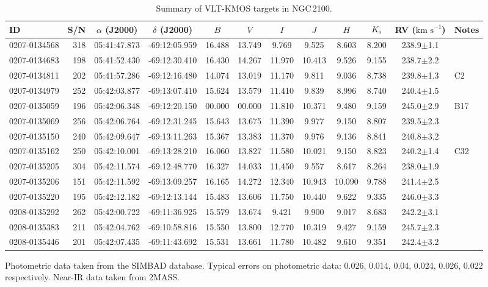 \documentclass[useAMS,usenatbib]{mn2e}
\def\kms{$\mbox{km s}^{-1}$}
\begin{document}
\begin{table}
\caption{
        Summary of VLT-KMOS targets in NGC\,2100.\label{tb:obs-params}
        }
\scriptsize
\begin{center}
\begin{tabular}{lrcccccccccl}
 \hline
 \hline
ID & S/N & $\alpha$ (J2000) & $\delta$ (J2000) & $B$ & $V$ & $I$ & $J$ & $H$ & $K_{\rm s}$ & RV (\kms) & Notes \\
 \hline
0207-0134568 & 318 & 05:41:47.873 & -69:12:05.959 & 16.488 & 13.749 &  9.769 &  9.525 &  8.603 & 8.200 & 238.9$\pm$1.1\\
0207-0134683 & 198 & 05:41:52.430 & -69:12:30.410 & 16.430 & 14.267 & 11.970 & 10.413 &  9.526 & 9.155 & 238.7$\pm$2.2\\
0207-0134811 & 202 & 05:41:57.286 & -69:12:16.480 & 14.074 & 13.019 & 11.170 &  9.811 &  9.036 & 8.738 & 239.8$\pm$1.3 & C2\\
0207-0134979 & 252 & 05:42:03.877 & -69:13:07.410 & 15.624 & 13.579 & 11.410 &  9.839 &  8.996 & 8.740 & 240.4$\pm$1.5\\
0207-0135059 & 196 & 05:42:06.348 & -69:12:20.150 & 00.000 & 00.000 & 11.810 & 10.371 &  9.480 & 9.159 & 245.0$\pm$2.9 & B17\\
0207-0135069 & 256 & 05:42:06.764 & -69:12:31.245 & 15.643 & 13.675 & 11.390 &  9.977 &  9.150 & 8.807 & 239.5$\pm$2.3\\
0207-0135150 & 240 & 05:42:09.647 & -69:13:11.263 & 15.367 & 13.383 & 11.370 &  9.976 &  9.136 & 8.841 & 240.8$\pm$3.2\\
0207-0135162 & 250 & 05:42:10.001 & -69:13:28.210 & 16.060 & 13.827 & 11.580 & 10.021 &  9.150 & 8.823 & 240.2$\pm$1.4 & C32\\
0207-0135205 & 304 & 05:42:11.574 & -69:12:48.770 & 16.327 & 14.033 & 11.450 &  9.557 &  8.617 & 8.264 & 238.0$\pm$1.9\\
0207-0135206 & 151 & 05:42:11.592 & -69:13:09.257 & 16.165 & 14.272 & 12.340 & 10.943 & 10.090 & 9.788 & 241.4$\pm$2.5\\
0207-0135220 & 195 & 05:42:12.182 & -69:12:13.144 & 15.483 & 13.606 & 11.750 & 10.440 &  9.622 & 9.335 & 246.0$\pm$3.3\\
0208-0135292 & 262 & 05:42:00.722 & -69:11:36.925 & 15.579 & 13.674 &  9.421 &  9.900 &  9.017 & 8.683 & 242.2$\pm$3.1\\
0208-0135383 & 211 & 05:42:04.762 & -69:10:58.816 & 15.550 & 13.800 & 12.770 & 10.319 &  9.427 & 9.159 & 245.7$\pm$2.3\\
0208-0135446 & 201 & 05:42:07.435 & -69:11:43.692 & 15.531 & 13.661 & 11.780 & 10.482 &  9.610 & 9.351 & 242.4$\pm$3.2\\
\hline
\end{tabular}
\end{center}
{Photometric data taken from the SIMBAD database. Typical errors on photometric data:
0.026, 0.014, 0.04, 0.024, 0.026, 0.022 respectively.
Near-IR data taken from 2MASS.}
\end{table}
\end{document}
